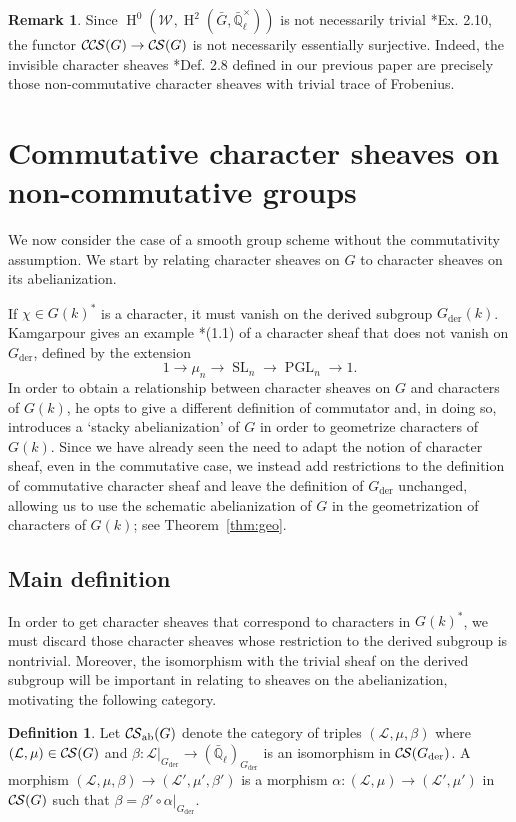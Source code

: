 \documentclass[10pt]{amsart}
\theoremstyle{plain}
\theoremstyle{definition}
\newtheorem{definition}[theorem]{Definition}
\newtheorem{remark}[theorem]{Remark}
\newcommand{\EE}{\mathbb{\bar Q}_\ell}
\newcommand{\Fq}{k}
\newcommand{\EEx}{\EE^\times}
\newcommand{\Weil}[1]{\mathcal{W}_{#1}}
\DeclareMathOperator{\Hh}{H}
\DeclareMathOperator{\SL}{SL}
\DeclareMathOperator{\PGL}{PGL}
\newcommand{\der}{_{\operatorname{der}}}
\newcommand{\cs}[1]{{\mathcal{#1}}}
\newcommand{\CS}{{\mathcal{C\hskip-0.8pt S}}}
\newcommand{\CCS}{{\mathcal{C\hskip-.8pt C\hskip-0.8pt S}}}
\newcommand{\CSab}{\CS_{\operatorname{ab}}}
\newcommand{\bG}{\bar{G}}
\begin{document}
\begin{remark}
Since $\Hh^0(\Weil{},\Hh^2(\bG,\EEx))$ is not necessarily trivial \cite{cunningham-roe:13a}*{Ex. 2.10}, the functor
$\CCS(G) \to \CS(G)$ is not necessarily essentially surjective.  Indeed, the invisible character sheaves \cite{cunningham-roe:13a}*{Def. 2.8}
defined in our previous paper are precisely those non-commutative character sheaves with trivial trace of Frobenius.
\end{remark}

\section{Commutative character sheaves on non-commutative groups}\label{sec:noncom}

We now consider the case of a smooth group scheme without the commutativity assumption.  We start
by relating character sheaves on $G$ to character sheaves on its abelianization.

If $\chi \in G(k)^*$ is a character, it must vanish on the derived subgroup $G\der(k)$.
Kamgarpour gives an example \cite{kamgarpour:09a}*{(1.1)} of a character sheaf
that does not vanish on $G\der$, defined by the extension
\[
1 \to \mu_n \to \SL_n \to \PGL_n \to 1.
\]
In order to obtain a relationship between character sheaves on $G$ and characters of $G(k)$,
he opts to give a different definition of commutator and, in doing so, introduces a `stacky abelianization' of $G$ in order to geometrize characters of $G(\Fq)$.
 Since we have already seen the need to adapt the
notion of character sheaf, even in the commutative case, we instead add restrictions
to the definition of commutative character sheaf and leave the definition of $G\der$ unchanged, allowing us to use the schematic abelianization of $G$ in the geometrization of characters of $G(\Fq)$; see Theorem~\ref{thm:geo}.

\subsection{Main definition}\label{ssec:noncomdef}

In order to get character sheaves that correspond to characters in $G(k)^*$, we must discard those
character sheaves whose restriction to the derived subgroup is nontrivial.  Moreover, the isomorphism
with the trivial sheaf on the derived subgroup will be important in relating to sheaves on the abelianization,
motivating the following category.

\begin{definition}\label{def:CSab}
Let $\CSab(G)$ denote the category of triples $(\cs{L},\mu,\beta)$ where $(\cs{L},\mu) \in \CS(G)$ and
$\beta : \cs{L}\vert_{G\der} \to (\EE)_{G\der}$ is an isomorphism in $\CS(G\der)$.
A morphism $(\cs{L},\mu,\beta)\to (\cs{L}',\mu',\beta')$ is a morphism $\alpha : (\cs{L},\mu)\to (\cs{L}',\mu')$
in $\CS(G)$ such that $\beta = \beta' \circ \alpha\vert_{G\der}$.  
\end{definition}
\end{document}
